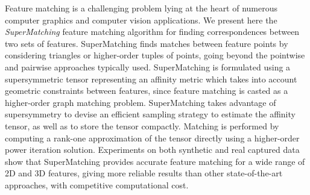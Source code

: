 Feature matching is a challenging problem lying at the heart of numerous computer graphics and computer vision applications.
We present here the \emph{SuperMatching} feature matching algorithm for finding correspondences between two sets of features.
SuperMatching finds matches between feature points by considering triangles or higher-order tuples of points, going beyond the pointwise and pairwise approaches typically used.
SuperMatching is formulated using a supersymmetric tensor representing an affinity metric which takes into account geometric constraints between features,
since feature matching is casted as a higher-order graph matching problem.
SuperMatching takes advantage of supersymmetry to devise an
efficient sampling strategy to estimate the affinity tensor, as well as to store the tensor compactly.
Matching is performed by computing a rank-one approximation of the tensor directly
using a higher-order power iteration solution.
Experiments on both synthetic and real captured data show that
SuperMatching provides accurate feature matching for a wide range of 2D and 3D features,
giving more reliable results than other state-of-the-art approaches, with competitive computational cost.